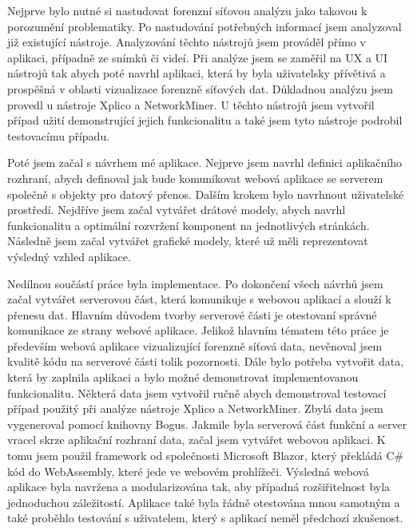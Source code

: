 Nejprve bylo nutné si nastudovat forenzní síťovou analýzu jako takovou k porozumění problematiky. Po nastudování potřebných informací jsem analyzoval již existující nástroje. Analyzování těchto nástrojů jsem prováděl přímo v aplikaci, případně ze snímků či videí. Při analýze jsem se zaměřil na \gls{UX} a \gls{UI} nástrojů tak abych poté navrhl aplikaci, která by byla uživatelsky přívětivá a prospěšná v oblasti vizualizace forenzně síťových dat. Důkladnou analýzu jsem provedl u nástroje Xplico a NetworkMiner. U těchto nástrojů jsem vytvořil případ užití demonstrující jejich funkcionalitu a také jsem tyto nástroje podrobil testovacímu případu.

Poté jsem začal s návrhem mé aplikace. Nejprve jsem navrhl definici aplikačního rozhraní, abych definoval jak bude komunikovat webová aplikace se serverem společně s objekty pro datový přenos. Dalším krokem bylo navrhnout uživatelské prostředí. Nejdříve jsem začal vytvářet drátové modely, abych navrhl funkcionalitu a optimální rozvržení komponent na jednotlivých stránkách. Následně jsem začal vytvářet grafické modely, které už měli reprezentovat výsledný vzhled aplikace.

Nedílnou součástí práce byla implementace. Po dokončení všech návrhů jsem začal vytvářet serverovou část, která komunikuje s webovou aplikací a slouží k přenesu dat. Hlavním důvodem tvorby serverové části je otestovaní správné komunikace ze strany webové aplikace. Jelikož hlavním tématem této práce je především webová aplikace vizualizující forenzně síťová data, nevěnoval jsem kvalitě kódu na serverové části tolik pozornosti. Dále bylo potřeba vytvořit data, která by zaplnila aplikaci a bylo možné demonstrovat implementovanou funkcionalitu. Některá data jsem vytvořil ručně abych demonstroval testovací případ použitý při analýze nástroje Xplico a NetworkMiner. Zbylá data jsem vygeneroval pomocí knihovny Bogus. Jakmile byla serverová část funkční a server vracel skrze aplikační rozhraní data, začal jsem vytvářet webovou aplikaci. K tomu jsem použil framework od společnosti Microsoft Blazor, který překládá C\# kód do WebAssembly, které jede ve webovém prohlížeči. Výsledná webová aplikace byla navržena a modularizována tak, aby případná rozšiřitelnost byla jednoduchou záležitostí. Aplikace také byla řádně otestována mnou samotným a také proběhlo testování s uživatelem, který s aplikací neměl předchozí zkušenost. 

\clearpage

\label{sec:forensicsTools}